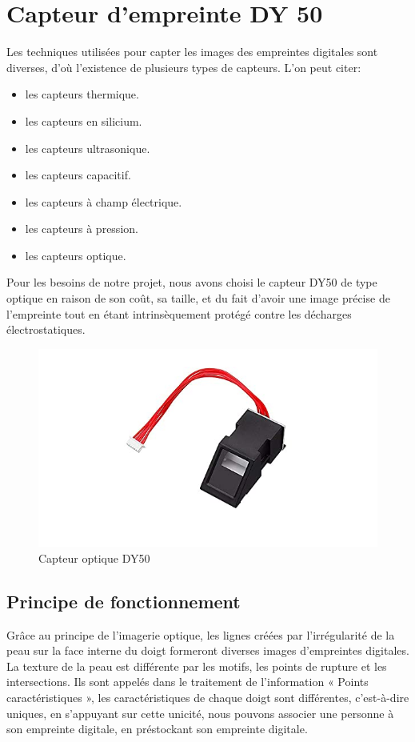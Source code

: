 \section{Capteur d'empreinte DY 50}
Les techniques utilisées pour capter les images des empreintes digitales sont 
diverses, d’où l’existence de plusieurs types de capteurs. L'on peut citer:

\begin{itemize}
    \item les capteurs thermique.
    \item les capteurs en silicium.
    \item les capteurs ultrasonique.
    \item les capteurs capacitif.
    \item les capteurs à champ électrique.
    \item les capteurs à pression.
    \item les capteurs optique.
\end{itemize}

Pour les besoins de notre projet, nous avons choisi le capteur DY50 de type
optique en raison de son coût, sa taille, et du fait d’avoir une image précise
de l’empreinte tout en étant intrinsèquement protégé contre les décharges
électrostatiques.

\begin{figure}[h!]
    \centering
    \includegraphics[scale=0.7]{images/dy50.jpg}
    \caption{Capteur optique DY50}
    \label{fig51}
\end{figure}
\clearpage
\subsection{Principe de fonctionnement}
Grâce au principe de l’imagerie optique, les lignes créées par l’irrégularité de 
la peau sur la face interne du doigt formeront diverses images d’empreintes 
digitales. La texture de la peau est différente par les motifs, les points de 
rupture et les intersections. Ils sont appelés dans le traitement de 
l’information « Points caractéristiques », les caractéristiques de chaque 
doigt sont différentes, c’est-à-dire uniques, en s’appuyant sur cette unicité, 
nous pouvons associer une personne à son empreinte digitale, en préstockant son 
empreinte digitale.

